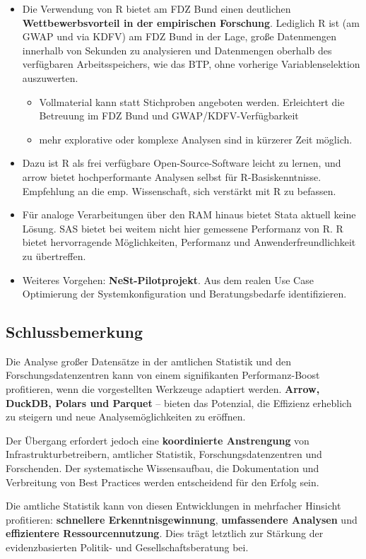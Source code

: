 \documentclass[
  german,
  10pt,
  twoside]{article}
\providecommand{\tightlist}{%
  \setlength{\itemsep}{0pt}\setlength{\parskip}{0pt}}
\let\oldtextbf\textbf
\renewcommand{\textbf}[1]{{\color{wistaBlue}\oldtextbf{#1}}}
\begin{document}
\begin{itemize}
\tightlist
\item
  Die Verwendung von R bietet am FDZ Bund einen deutlichen
  \textbf{Wettbewerbsvorteil in der empirischen Forschung}. Lediglich R
  ist (am GWAP und via KDFV) am FDZ Bund in der Lage, große Datenmengen
  innerhalb von Sekunden zu analysieren und Datenmengen oberhalb des
  verfügbaren Arbeitsspeichers, wie das BTP, ohne vorherige
  Variablenselektion auszuwerten.

  \begin{itemize}
  \tightlist
  \item
    Vollmaterial kann statt Stichproben angeboten werden. Erleichtert
    die Betreuung im FDZ Bund und GWAP/KDFV-Verfügbarkeit
  \item
    mehr explorative oder komplexe Analysen sind in kürzerer Zeit
    möglich.
  \end{itemize}
\item
  Dazu ist R als frei verfügbare Open-Source-Software leicht zu lernen,
  und arrow bietet hochperformante Analysen selbst für
  R-Basiskenntnisse. Empfehlung an die emp. Wissenschaft, sich verstärkt
  mit R zu befassen.
\item
  Für analoge Verarbeitungen über den RAM hinaus bietet Stata aktuell
  keine Lösung. SAS bietet bei weitem nicht hier gemessene Performanz
  von R. R bietet hervorragende Möglichkeiten, Performanz und
  Anwenderfreundlichkeit zu übertreffen.
\item
  Weiteres Vorgehen: \textbf{NeSt-Pilotprojekt}. Aus dem realen Use Case
  Optimierung der Systemkonfiguration und Beratungsbedarfe
  identifizieren.
\end{itemize}

\subsection{Schlussbemerkung}\label{schlussbemerkung}

Die Analyse großer Datensätze in der amtlichen Statistik und den
Forschungsdatenzentren kann von einem signifikanten Performanz-Boost
profitieren, wenn die vorgestellten Werkzeuge adaptiert werden.
\textbf{Arrow, DuckDB, Polars und Parquet} -- bieten das Potenzial, die
Effizienz erheblich zu steigern und neue Analysemöglichkeiten zu
eröffnen.

Der Übergang erfordert jedoch eine \textbf{koordinierte Anstrengung} von
Infrastrukturbetreibern, amtlicher Statistik, Forschungsdatenzentren und
Forschenden. Der systematische Wissensaufbau, die Dokumentation und
Verbreitung von Best Practices werden entscheidend für den Erfolg sein.

Die amtliche Statistik kann von diesen Entwicklungen in mehrfacher
Hinsicht profitieren: \textbf{schnellere Erkenntnisgewinnung},
\textbf{umfassendere Analysen} und \textbf{effizientere
Ressourcennutzung}. Dies trägt letztlich zur Stärkung der
evidenzbasierten Politik- und Gesellschaftsberatung bei.


\printbibliography
\end{document}
